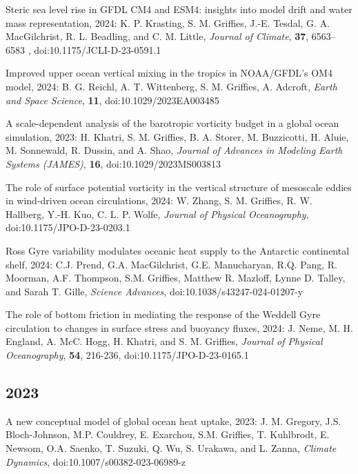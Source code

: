 \begin{etaremune}


\item Steric sea level rise in GFDL CM4 and ESM4: insights into model drift and water mass representation, 2024: K. P. Krasting, S. M. Grif\/f\/ies, J.-E. Tesdal, G. A. MacGilchrist, R. L. Beadling, and C. M. Little, {\it  Journal of Climate}, {\bf 37}, 6563–6583 , doi:10.1175/JCLI-D-23-0591.1

\item Improved upper ocean vertical mixing in the tropics in NOAA/GFDL's OM4 model, 2024: B. G. Reichl, A. T. Wittenberg, S. M. Grif\/f\/ies, A. Adcroft, {\it Earth and Space Science}, {\bf 11}, doi:10.1029/2023EA003485

\item A scale-dependent analysis of the barotropic vorticity budget in a global ocean simulation, 2023: H. Khatri, S. M. Grif\/f\/ies, B. A. Storer, M. Buzzicotti, H. Aluie, M. Sonnewald, R. Dussin, and A. Shao, {\it Journal of Advances in Modeling Earth Systems (JAMES)}, {\bf 16}, doi:10.1029/2023MS003813

\item The role of surface potential vorticity in the vertical structure of mesoscale eddies in wind-driven ocean circulations, 2024: W. Zhang, S. M. Grif\/f\/ies, R. W. Hallberg, Y.-H. Kuo, C. L. P. Wolfe, {\it Journal of Physical Oceanography}, doi:10.1175/JPO-D-23-0203.1

\item Ross Gyre variability modulates oceanic heat supply to the Antarctic continental shelf, 2024: C.J. Prend, G.A. MacGilchrist, G.E. Manucharyan, R.Q. Pang, R. Moorman, A.F. Thompson, S.M. Grif\/f\/ies, Matthew R. Mazloff, Lynne D. Talley, and Sarah T. Gille, {\it Science Advances}, doi:10.1038/s43247-024-01207-y

\item  The role of bottom friction in mediating the response of the Weddell Gyre circulation to changes in surface stress and buoyancy fluxes, 2024: J. Neme, M. H. England, A. McC. Hogg, H. Khatri, and S. M. Grif\/f\/ies, {\it Journal of Physical Oceanography}, {\bf 54}, 216-236, doi:10.1175/JPO-D-23-0165.1 


\subsection*{\sc \color{Maroon} 2023}


\item A new conceptual model of global ocean heat uptake, 2023:  J. M. Gregory, J.S. Bloch-Johnson, M.P. Couldrey, E. Exarchou, S.M. Grif\/f\/ies, T. Kuhlbrodt, E. Newsom, O.A. Saenko, T. Suzuki, Q. Wu, S. Urakawa, and L. Zanna, {\it Climate Dynamics}, doi:10.1007/s00382-023-06989-z
 

\end{etaremune}
